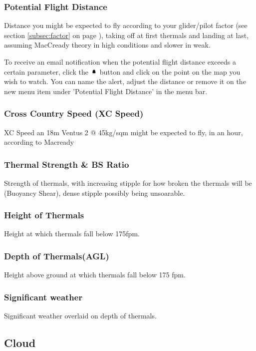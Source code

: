 \documentclass[11pt,a4paper]{article}
\begin{document}
\subsubsection{Potential Flight Distance}
Distance you might be expected to fly according to your glider/pilot factor (see section \ref{subsec:factor} on page \pageref{subsec:factor}), taking off at first thermals and landing at last, assuming MacCready theory in high conditions and slower in weak.
\begin{tip}
  \item To receive an email notification when the potential flight distance exceeds a certain parameter, click the \includegraphics[height=9pt]{images/icons/bell.png} button and click on the point on the map you wish to watch. You can name the alert, adjust the distance or remove it on the new menu item under 'Potential Flight Distance' in the menu bar. \\
\end{tip}
  
\subsubsection{Cross Country Speed (XC Speed)}
XC Speed an 18m Ventus 2 @ 45kg/sqm might be expected to fly, in an hour, according to Macready
\subsubsection{Thermal Strength \& BS Ratio}
Strength of thermals, with increasing stipple for how broken the thermals will be (Buoyancy Shear), dense stipple possibly being unsoarable.
\subsubsection{Height of Thermals}
Height at which thermals fall below 175fpm.
\subsubsection{Depth of Thermals(AGL)}
Height above ground at which thermals fall below 175 fpm.
\subsubsection{Significant weather}
Significant weather overlaid on depth of thermals.
\subsection{Cloud}
\end{document}

